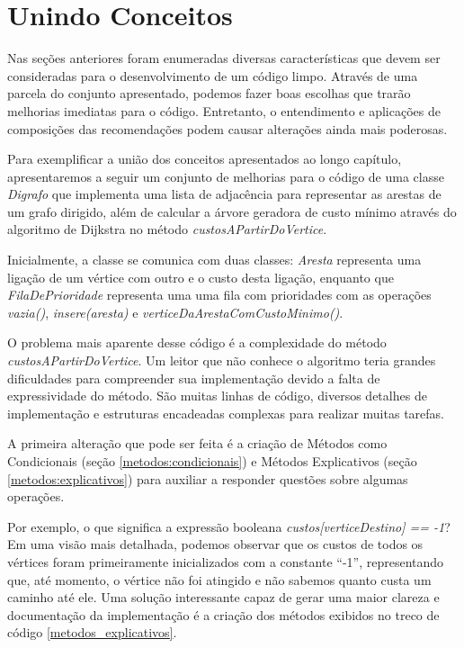 \section{Unindo Conceitos}
\label{unindo_conceitos}
Nas seções anteriores foram enumeradas diversas características que devem ser consideradas para o desenvolvimento de 
um código limpo. Através de uma parcela do conjunto apresentado, podemos fazer boas escolhas que trarão melhorias 
imediatas para o código. Entretanto, o entendimento e aplicações de composições das recomendações podem causar 
alterações ainda mais poderosas.

Para exemplificar a união dos conceitos apresentados ao longo capítulo, apresentaremos a seguir um 
conjunto de melhorias para o código de uma classe \textit{Digrafo} que implementa uma lista de adjacência para 
representar as arestas de um grafo dirigido, além de calcular a árvore geradora de custo mínimo através do algoritmo de 
Dijkstra no método \textit{custosAPartirDoVertice}.

Inicialmente, a classe se comunica com duas classes: \textit{Aresta} representa uma ligação de um vértice com outro e o 
custo desta ligação, enquanto que \textit{FilaDePrioridade} representa uma uma fila com prioridades com as operações 
\textit{vazia()}, \textit{insere(aresta)} e \textit{verticeDaArestaComCustoMinimo()}.



O problema mais aparente desse código é a complexidade do método \textit{custosAPartirDoVertice}. Um leitor 
que não conhece o algoritmo teria grandes dificuldades para compreender sua implementação devido a falta de 
expressividade do método. São muitas linhas de código, diversos detalhes de implementação e estruturas encadeadas 
complexas para realizar muitas tarefas. 

A primeira alteração que pode ser feita é a criação de Métodos como Condicionais (seção \ref{metodos:condicionais}) e 
Métodos Explicativos (seção \ref{metodos:explicativos}) para auxiliar a responder questões sobre algumas operações.

Por exemplo, o que significa a expressão booleana \textit{custos[verticeDestino] == -1}? Em uma visão mais detalhada, 
podemos observar que os custos de todos os vértices foram primeiramente inicializados com a constante ``-1'', 
representando que, até momento, o vértice não foi atingido e não sabemos quanto custa um caminho até ele. Uma solução 
interessante capaz de gerar uma maior clareza e documentação da implementação é a criação dos métodos exibidos
no treco de código \ref{metodos_explicativos}.

